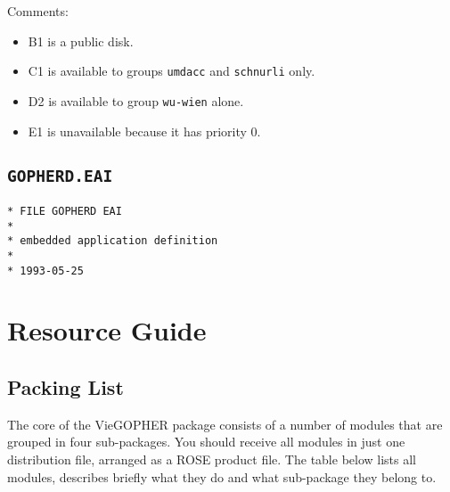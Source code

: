\begin{appendix}
\noindent Comments:
\begin{itemize}
\item B1 is a public disk.
\item C1 is available to groups {\tt umdacc} and {\tt schnurli} only.
\item D2 is available to group {\tt wu-wien} alone.
\item E1 is unavailable because it has priority 0.
\end{itemize}



\subsection{\tt GOPHERD.EAI}\label{example GOPHERD.EAI}
\begin{small}
\begin{verbatim}
* FILE GOPHERD EAI
*
* embedded application definition
*
* 1993-05-25
\end{verbatim}
\end{small}


\section{Resource Guide}



\subsection{Packing List}

The core of the VieGOPHER package consists of a number of modules that
are grouped in four sub-packages.  You should receive all modules in
just one distribution file, arranged as a ROSE product file.  The table
below lists all modules, describes briefly what they do and what sub-package
they belong to.\\
\rule{0mm}{2mm}


\end{appendix}

